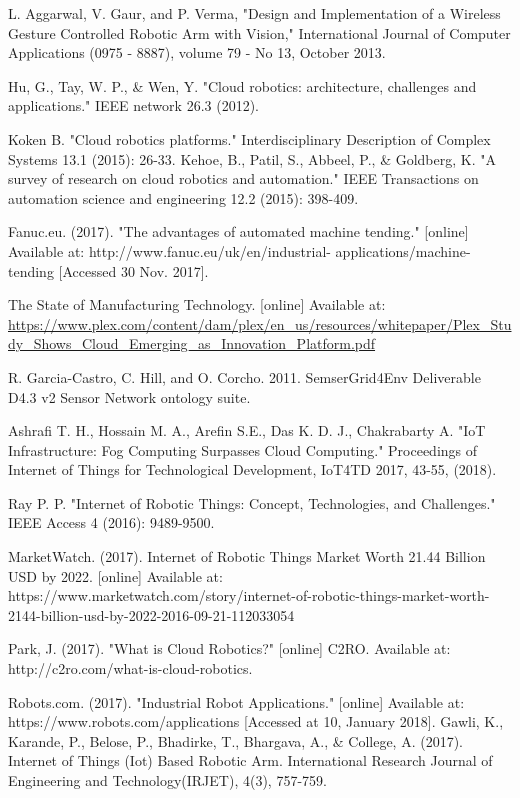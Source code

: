 \documentclass[conference]{IEEEtran}
\begin{document}
\begin{thebibliography}{1}

L. Aggarwal, V. Gaur, and P. Verma, "Design and Implementation of a Wireless Gesture Controlled Robotic Arm with Vision," International Journal of Computer Applications (0975 - 8887), volume 79 - No 13, October 2013.

Hu, G., Tay, W. P., \& Wen, Y. "Cloud robotics: architecture, challenges and applications." IEEE network 26.3 (2012).


Koken B. "Cloud robotics platforms." Interdisciplinary Description of Complex Systems 13.1 (2015): 26-33. 
Kehoe, B., Patil, S., Abbeel, P., \& Goldberg, K. "A survey of research on cloud robotics and automation." IEEE Transactions on automation science and engineering 12.2 (2015): 398-409.

Fanuc.eu. (2017). "The advantages of automated machine tending." [online] Available at: http://www.fanuc.eu/uk/en/industrial- applications/machine-tending [Accessed 30 Nov. 2017].

The State of Manufacturing Technology. [online] Available at: 
\url{https://www.plex.com/content/dam/plex/en_us/resources/whitepaper/Plex_Study_Shows_Cloud_Emerging_as_Innovation_Platform.pdf}

R. Garcia-Castro, C. Hill, and O. Corcho. 2011. SemserGrid4Env Deliverable D4.3 v2 Sensor Network ontology suite.

Ashrafi T. H., Hossain M. A., Arefin S.E., Das K. D. J., Chakrabarty A. "IoT Infrastructure: Fog Computing Surpasses Cloud Computing." Proceedings of Internet of Things for Technological Development, IoT4TD 2017, 43-55, (2018).

Ray P. P. "Internet of Robotic Things: Concept, Technologies, and Challenges." IEEE Access 4 (2016): 9489-9500.

MarketWatch. (2017). Internet of Robotic Things Market Worth 21.44 Billion USD by 2022. [online] Available at: https://www.marketwatch.com/story/internet-of-robotic-things-market-worth-2144-billion-usd-by-2022-2016-09-21-112033054

Park, J. (2017). "What is Cloud Robotics?" [online] C2RO. Available at: http://c2ro.com/what-is-cloud-robotics.

Robots.com. (2017). "Industrial Robot Applications." [online] Available at: https://www.robots.com/applications [Accessed at 10, January 2018].
Gawli, K., Karande, P., Belose, P., Bhadirke, T., Bhargava, A., \& College, A. (2017). Internet of Things (Iot) Based Robotic Arm. International Research Journal of Engineering and Technology(IRJET), 4(3), 757-759.


\end{thebibliography}
\end{document}
